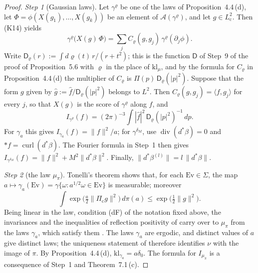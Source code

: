 \documentclass[11pt,letterpaper,reqno]{amsart}
\theoremstyle{definition}
\begin{document}
\begin{proof}
\emph{Step 1} (Gaussian laws).
Let $\gamma^\varrho$ be one of the laws of Proposition~4.4\,(d), let $\Phi=\phi(X(g_1),\dots,X(g_k))$ be an element of $\mathcal A(\gamma^\varrho)$, and let $g\in L^2_{\mathrm c}$.
Then (K14) yields
\begin{equation*}
\gamma^\varrho\bigl(X(g)\,\Phi\bigr)=\sum_jC_\varrho(g,g_j)\,\gamma^\varrho(\partial_j\phi).
\end{equation*}
Write $\mathsf D_\varrho(r):=\int d\varrho(t)\,r/(r+t^2)$;
this is the function $\mathsf D$ of Step~9 of the proof of Proposition~5.6 with $\varrho$ in the place of $\mathrm{kl}_\mu$,
and by the formula for $C_\varrho$ in Proposition~4.4\,(d) the multiplier of $C_\varrho$ is $\Pi(p)\,\mathsf D_\varrho(|p|^2)$.
Suppose that the form $g$ given by $\hat g:=\hat f/\mathsf D_\varrho(|p|^2)$ belongs to $L^2$.
Then $C_\varrho(g,g_j)=\langle f,g_j\rangle$ for every $j$,
so that $X(g)$ is the score of $\gamma^\varrho$ along $f$, and
\begin{equation*}
I_{\gamma^\varrho}(f)=(2\pi)^{-3}\int|\hat f|^2\,\mathsf D_\varrho(|p|^2)^{-1}\,dp.
\end{equation*}
For $\gamma_a$ this gives $I_{\gamma_a}(f)=\|f\|^2/a$;
for $\gamma^{\delta_M}$, use $\operatorname{div}(d^*\beta)=0$ and $\ast f=\operatorname{curl}(d^*\beta)$.
The Fourier formula in Step~1 then gives $I_{\gamma^{\delta_M}}(f)=\|f\|^2+M^2\|d^*\beta\|^2$.
Finally, $\|d^*\beta^{(l)}\|=l\,\|d^*\beta\|$.

\emph{Step 2} (the law $\mu_\pi$).
Tonelli's theorem shows that, for each $\mathrm{Ev}\in\Sigma$, the map $a\mapsto\gamma_a(\mathrm{Ev})=\allowbreak \gamma\{\omega:a^{1/2}\omega\in\mathrm{Ev}\}$ is measurable;
moreover
\begin{equation*}
\int\exp\bigl(\tfrac a2\|\Pi_{\mathrm c}g\|^2\bigr)\,d\pi(a)\le\exp\bigl(\tfrac12\|g\|^2\bigr).
\end{equation*}
Being linear in the law, condition (dF) of the notation fixed above, the invariances and the inequalities of reflection positivity of \cite[(n3)]{QEDIII} carry over to $\mu_\pi$ from the laws $\gamma_a$, which satisfy them \cite[Lemma~12.29]{QEDII}.
The laws $\gamma_a$ are ergodic,
and distinct values of $a$ give distinct laws;
the uniqueness statement of \cite[Proposition~45.6\,(a$''$)]{QEDIII} therefore identifies $\nu$ with the image of $\pi$.
By Proposition~4.4\,(d), $\mathrm{kl}_{\gamma_a}=a\delta_0$.
The formula for $I_{\mu_\pi}$ is a consequence of Step~1 and Theorem~7.1\,(c).


\end{proof}
\end{document}

